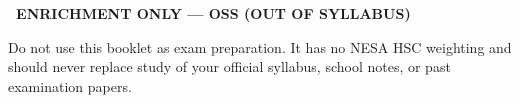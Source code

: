 \thispagestyle{empty}
\vspace*{\fill}
\begin{center}
\begin{tcolorbox}[
  width=0.88\textwidth,
  colback=black!5,
  colframe=black,
  boxrule=0.8pt,
  arc=2pt,
  left=12pt,
  right=12pt,
  top=12pt,
  bottom=12pt
]
\centering
\textbf{\Large \WarningSign\ ENRICHMENT ONLY --- OSS (OUT OF SYLLABUS)}

\vspace{0.8em}

\normalsize Do not use this booklet as exam preparation. It has no NESA HSC weighting and should never replace study of your official syllabus, school notes, or past examination papers.
\end{tcolorbox}
\end{center}
\vspace*{\fill}